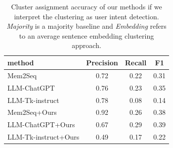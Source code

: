 \begin{table}[h]
    \centering
    \small
    \begin{tabular}{lccc}
    \hline
     \textbf{method} & \textbf{Precision} & \textbf{Recall} & \textbf{F1} \\
     \hline
     Mem2Seq & 0.72 & 0.22 & 0.31 \\
     LLM-ChatGPT & 0.76 & 0.23 & 0.35 \\
     LLM-Tk-instruct & 0.78 & 0.08 & 0.14 \\
     Mem2Seq+Ours & 0.92 & 0.26 & 0.38 \\
     LLM-ChatGPT+Ours & 0.67 & 0.29 & 0.39 \\
     LLM-Tk-instruct+Ours & 0.49 & 0.17 & 0.22 \\
     
     \hline
    \end{tabular}
    
    \caption{Cluster assignment accuracy of our methods if we interpret the clustering as user intent detection. \textit{Majority} is a majority baseline and \textit{Embedding} refers to an average sentence embedding clustering approach.
    }
    \label{table:intentclust}
\end{table}